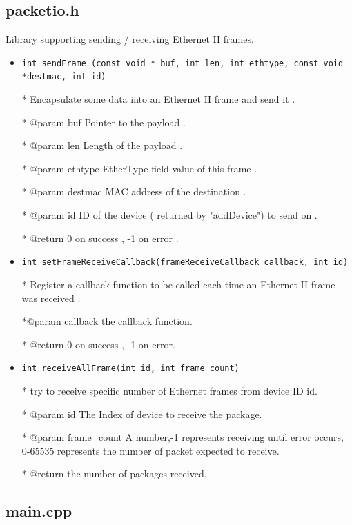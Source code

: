 \documentclass[11pt]{article}
\begin{document}
	\subsection*{packetio.h}
	\par Library supporting sending / receiving Ethernet II frames.
	\begin{itemize}
		\item \texttt{int sendFrame (const void * buf, int len, int ethtype, const void *destmac, int id)}
		
		* Encapsulate some data into an Ethernet II frame and send it .
		
		* @param buf Pointer to the payload .
		
		* @param len Length of the payload .
		
		* @param ethtype EtherType field value of this frame .
		
		* @param destmac MAC address of the destination .
		
		* @param id ID of the device ( returned by "addDevice") to send on .
		
		* @return 0 on success , -1 on error .
		
		\item \texttt{int setFrameReceiveCallback(frameReceiveCallback callback, int id)}
		
		* Register a callback function to be called each time an Ethernet II frame was received .
		
		*@param callback the callback function.
		
		* @return 0 on success , -1 on error.
		
		\item \texttt{int receiveAllFrame(int id, int frame\_count)}
		
		* try to receive specific number of Ethernet frames from device ID id.
		
		* @param id The Index of device to receive the package.
		
		* @param frame\_count A number,-1 represents receiving until error occurs, 0-65535 represents the number of packet expected to receive.
		
		* @return the number of packages received,
	\end{itemize}
	
	\subsection*{main.cpp}
		
\end{document}
